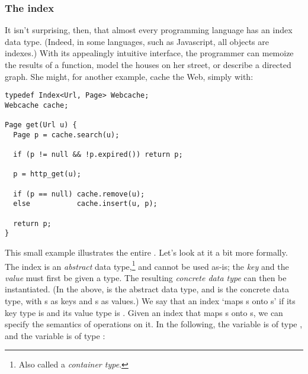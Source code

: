 \subsubsection{The index \API}

It isn't surprising, then, that
  almost every programming language has an index data type.\cite{wp_mapping}
(Indeed, in some languages, such as Javascript\footnotemark,
  all objects are indexes.)
With its appealingly intuitive interface,
  the programmer can memoize the results of a function,
  model the houses on her street,
  or describe a directed graph.
She might, for another example, cache the Web,
  simply with:\footnotemark



\begin{verbatim}
typedef Index<Url, Page> Webcache;
Webcache cache;

Page get(Url u) {
  Page p = cache.search(u);

  if (p != null && !p.expired()) return p;

  p = http_get(u);

  if (p == null) cache.remove(u);
  else           cache.insert(u, p);

  return p;
}
\end{verbatim}

This small example illustrates the entire \API.
Let's look at it a bit more formally.
The index is an \emph{abstract} data type,\footnote{Also called a \emph{container type}.}
  and cannot be used as-is;
  the \emph{key} and the \emph{value} must first be given a type.
The resulting \emph{concrete data type} can then be instantiated.
(In the above,
   is the abstract data type,
  and  is the concrete data type,
  with s as keys
  and s as values.)
We say that an index `maps s onto s'
  if its key type is 
  and its value type is .
Given an index 
  that maps s onto s,
  we can specify the semantics of operations on it.
In the following,
  the variable  is of type ,
  and the variable  is of type :

